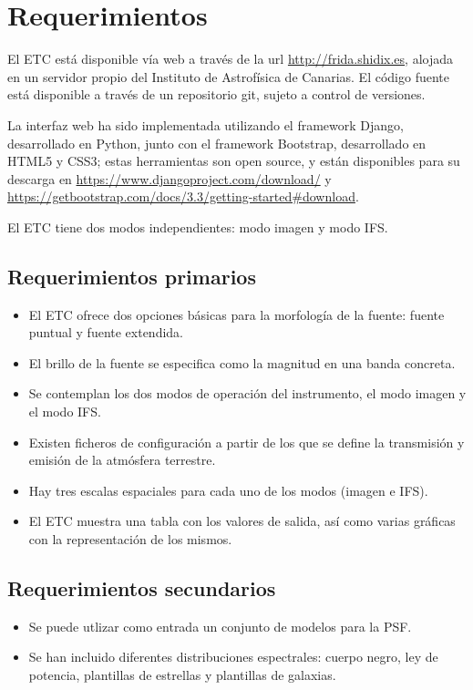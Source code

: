 \section{Requerimientos}
El ETC est\'a disponible v\'ia web a trav\'es de la url \url{http://frida.shidix.es}, alojada en un servidor propio del Instituto de Astrof\'isica de Canarias. El código fuente está disponible a través de un repositorio git, sujeto a control de versiones.  

La interfaz web ha sido implementada utilizando el framework Django, desarrollado en Python, junto con el framework Bootstrap, desarrollado en HTML5 y CSS3; estas herramientas son open source, y están disponibles para su descarga en \url{https://www.djangoproject.com/download/} y \url{https://getbootstrap.com/docs/3.3/getting-started#download}.

El ETC tiene dos modos independientes: modo imagen y modo IFS.

\subsection{Requerimientos primarios}
\begin{itemize}
    \item El ETC ofrece dos opciones b\'asicas para la morfolog\'ia de la fuente: fuente puntual y fuente extendida. 
    \item El brillo de la fuente se especifica como la magnitud en una banda concreta. 
    \item Se contemplan los dos modos de operaci\'on del instrumento, el modo imagen y el modo IFS.
    \item Existen ficheros de configuraci\'on a partir de los que se define la transmisi\'on y emisi\'on de la atm\'osfera terrestre.
    \item Hay tres escalas espaciales para cada uno de los modos (imagen e IFS).
    \item El ETC muestra una tabla con los valores de salida, as\'i como varias gr\'aficas con la representaci\'on de los mismos.

\end{itemize}

\subsection{Requerimientos secundarios}
\begin{itemize}
    \item Se puede utlizar como entrada un conjunto de modelos para la PSF.
    \item Se han incluido diferentes distribuciones espectrales: cuerpo negro, ley de potencia, plantillas de estrellas y plantillas de galaxias.
\end{itemize}


